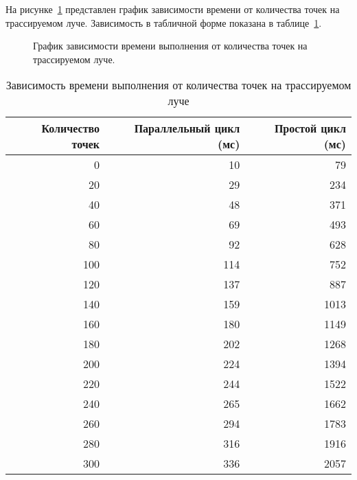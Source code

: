 На рисунке~\ref{fig:plot} представлен график зависимости времени от количества точек на трассируемом луче. Зависимость в табличной форме показана в таблице~\ref{tab:steps_time}.

\vspace{-5cm}
\begin{figure}[ht!]
	\centering
	   
	\caption{График зависимости времени выполнения от количества точек на трассируемом луче.}
	\label{fig:plot}
\end{figure}

\begin{table}
\caption{Зависимость времени выполнения от количества точек на трассируемом луче}
\begin{tabular}{|r|r|r|}
	\hline
	\textbf{Количество точек} & \textbf{Параллельный цикл (мс)} & \textbf{Простой цикл (мс)} \\ \hline
	0              & 10            & 79            \\ \hline
	20             & 29            & 234           \\ \hline
	40             & 48            & 371            \\ \hline
	60             & 69            & 493           \\ \hline
	80             & 92            & 628           \\ \hline
	100            & 114           & 752           \\ \hline
	120            & 137           & 887           \\ \hline
	140            & 159            & 1013          \\ \hline
	160            & 180           & 1149          \\ \hline
	180            & 202           & 1268          \\ \hline
	200            & 224             & 1394          \\ \hline
	220            & 244           & 1522          \\ \hline
	240            & 265           & 1662          \\ \hline
	260            & 294           & 1783          \\ \hline
	280            & 316            & 1916          \\ \hline
	300            & 336           & 2057          \\ \hline
\end{tabular}
\label{tab:steps_time}
\end{table}
\clearpage

